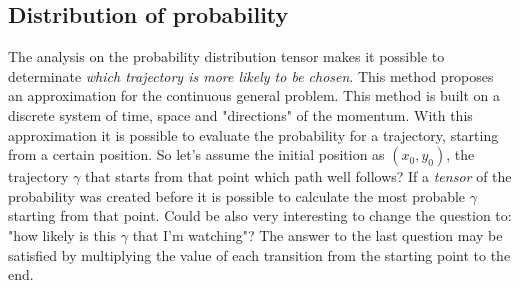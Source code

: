 \documentclass[class=article, crop=false]{standalone}
\begin{document}
\subsection{Distribution of probability}
The analysis on the probability distribution tensor makes it possible to determinate \emph{which trajectory is more likely to be chosen}.
This method proposes an approximation for the continuous general problem.
This method is built on a discrete system of time, space and "directions" of the momentum.
With this approximation it is possible to evaluate the probability for a trajectory, starting from a certain position.
So let's assume the initial position as $(x_0, y_0)$, the trajectory $\gamma$ that starts from that point which path well follows?
If a \emph{tensor} of the probability was created before it is possible to calculate the most probable $\gamma$ starting from that point.
Could be also very interesting to change the question to: "how likely is this $\gamma$ that I'm watching"?
The answer to the last question may be satisfied by multiplying the value of each transition from the starting point to the end.
\end{document}

